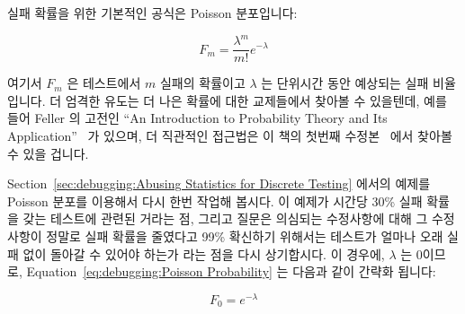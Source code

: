 실패 확률을 위한 기본적인 공식은 Poisson 분포입니다:

\begin{equation}
	F_m = \frac{\lambda^m}{m!} e^{-\lambda}
\label{eq:debugging:Poisson Probability}
\end{equation}

여기서 $F_m$ 은 테스트에서 $m$ 실패의 확률이고 $\lambda$ 는 단위시간 동안
예상되는 실패 비율입니다.
더 엄격한 유도는 더 나은 확률에 대한 교제들에서 찾아볼 수 있을텐데, 예를 들어
Feller 의 고전인 ``An Introduction to Probability Theory and Its
Application''~\cite{Feller58} 가 있으며, 더 직관적인 접근법은 이 책의 첫번째
수정본~\cite{McKenney2014ParallelProgramming-e1} 에서 찾아볼 수 있을 겁니다.

Section~\ref{sec:debugging:Abusing Statistics for Discrete Testing} 에서의
예제를 Poisson 분포를 이용해서 다시 한번 작업해 봅시다.
이 예제가 시간당 30\% 실패 확률을 갖는 테스트에 관련된 거라는 점, 그리고 질문은
의심되는 수정사항에 대해 그 수정사항이 정말로 실패 확률을 줄였다고 99\%
확신하기 위해서는 테스트가 얼마나 오래 실패 없이 돌아갈 수 있어야 하는가 라는
점을 다시 상기합시다.
이 경우에, $\lambda$ 는 0이므로,
Equation~\ref{eq:debugging:Poisson Probability} 는 다음과 같이 간략화 됩니다:

\begin{equation}
	F_0 =  e^{-\lambda}
\end{equation}

